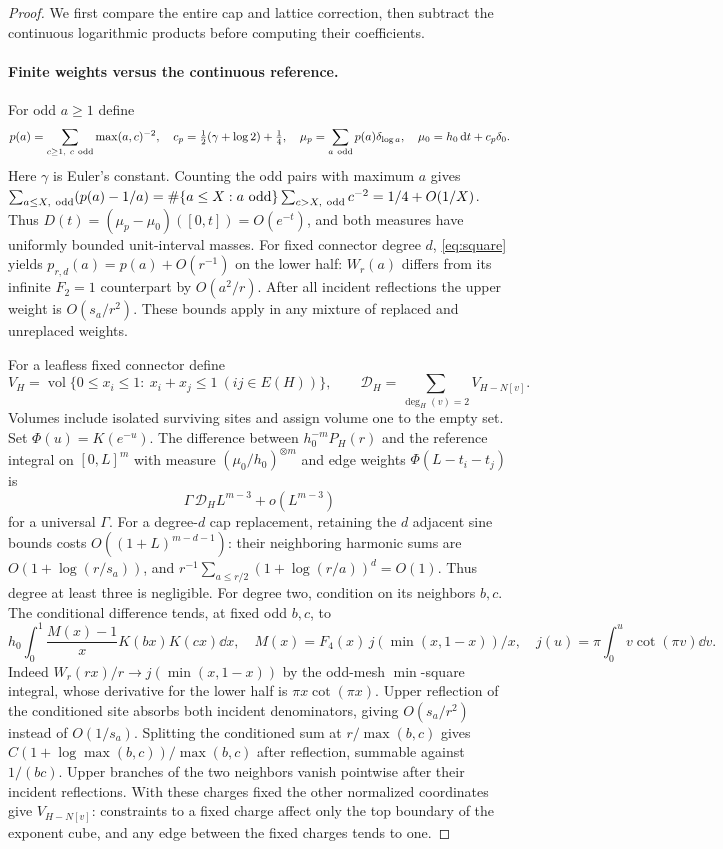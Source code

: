 \begin{proof}
We first compare the entire cap and lattice correction, then subtract the continuous logarithmic products before computing their coefficients.

\paragraph{Finite weights versus the continuous reference.}
For odd \(a\ge1\) define
\[
 p(a)=\sum_{c\ge1,\ c\ {\rm odd}}\max(a,c)^{-2},\quad
 c_p=\tfrac12(\gamma+\log2)+\tfrac14,\quad
 \mu_p=\sum_{a\ {\rm odd}}p(a)\delta_{\log a},\quad
 \mu_0=h_0\,\mathrm d t+c_p\delta_0 .
\]
Here \(\gamma\) is Euler's constant. Counting the odd pairs with maximum \(a\) gives
\(\sum_{a\le X,\ {\rm odd}}(p(a)-1/a)=\#\{a\le X:a\text{ odd}\}
\sum_{c>X,\ {\rm odd}}c^{-2}=1/4+O(1/X)\).
Thus \(D(t)=(\mu_p-\mu_0)([0,t])=O(e^{-t})\), and both measures have uniformly bounded unit-interval masses. For fixed connector degree \(d\), \eqref{eq:square} yields \(p_{r,d}(a)=p(a)+O(r^{-1})\) on the lower half: \(W_r(a)\) differs from its infinite \(F_2=1\) counterpart by \(O(a^2/r)\). After all incident reflections the upper weight is \(O(s_a/r^2)\). These bounds apply in any mixture of replaced and unreplaced weights.

For a leafless fixed connector define
\[
 V_H=\operatorname{vol}\{0\le x_i\le1:\ x_i+x_j\le1\ (ij\in E(H))\},
 \qquad \mathcal D_H=\sum_{\deg_H(v)=2}V_{H-N[v]} .
\]
Volumes include isolated surviving sites and assign volume one to the empty set. Set \(\Phi(u)=K(e^{-u})\). The difference between \(h_0^{-m}P_H(r)\) and the reference integral on \([0,L]^m\) with measure \((\mu_0/h_0)^{\otimes m}\) and edge weights \(\Phi(L-t_i-t_j)\) is
\begin{equation}\label{eq:micro}
 \Gamma\,\mathcal D_H L^{m-3}+o(L^{m-3})
\end{equation}
for a universal \(\Gamma\). For a degree-\(d\) cap replacement, retaining the \(d\) adjacent sine bounds costs \(O((1+L)^{m-d-1})\): their neighboring harmonic sums are \(O(1+\log(r/s_a))\), and \(r^{-1}\sum_{a\le r/2}(1+\log(r/a))^d=O(1)\). Thus degree at least three is negligible. For degree two, condition on its neighbors \(b,c\). The conditional difference tends, at fixed odd \(b,c\), to
\[
 h_0\int_0^1\frac{M(x)-1}{x}K(bx)K(cx)\dd x,\quad
 M(x)=F_4(x)\,j(\min(x,1-x))/x,\quad
 j(u)=\pi\int_0^u v\cot(\pi v)\dd v .
\]
Indeed \(W_r(rx)/r\to j(\min(x,1-x))\) by the odd-mesh \(\min\)-square integral, whose derivative for the lower half is \(\pi x\cot(\pi x)\). Upper reflection of the conditioned site absorbs both incident denominators, giving \(O(s_a/r^2)\) instead of \(O(1/s_a)\). Splitting the conditioned sum at \(r/\max(b,c)\) gives \(C(1+\log\max(b,c))/\max(b,c)\) after reflection, summable against \(1/(bc)\). Upper branches of the two neighbors vanish pointwise after their incident reflections. With these charges fixed the other normalized coordinates give \(V_{H-N[v]}\): constraints to a fixed charge affect only the top boundary of the exponent cube, and any edge between the fixed charges tends to one.


\end{proof}

